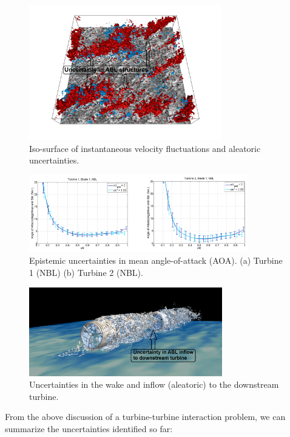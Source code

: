 \documentclass[]{aiaa-tc}%
\begin{document}
\begin{figure}
\centering
 \includegraphics[width=0.75\textwidth]{UQ1.png}
 \caption{Iso-surface of instantaneous velocity fluctuations and aleatoric uncertainties.}
 \label{f:UQ1}
\end{figure}

\begin{figure}
\centering
 \includegraphics[width=0.85\textwidth]{ALM_discrepancy.png}
 \caption{Epistemic uncertainties in mean angle-of-attack (AOA). (a) Turbine 1 (NBL)    (b) Turbine 2 (NBL).}
 \label{f:ALM_discrepancy}
\end{figure}

\begin{figure}
\centering
 \includegraphics[width=0.75\textwidth]{UQ3.png}
 \caption{Uncertainties in the wake and inflow (aleatoric) to the downstream turbine.}
 \label{f:UQ3}
\end{figure}

From the above discussion of a turbine-turbine interaction problem, we can summarize the uncertainties identified so far:
\end{document}
